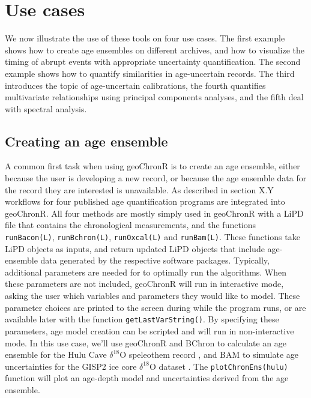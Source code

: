 \documentclass[gc, manuscript]{copernicus}
\begin{document}
\hypertarget{sec:use-cases}{%
\section{Use cases}\label{sec:use-cases}}

We now illustrate the use of these tools on four use cases. The first example shows how to create age ensembles on different archives, and how to visualize the timing of abrupt events with appropriate uncertainty quantification. The second example shows how to quantify similarities in age-uncertain records. The third introduces the topic of age-uncertain calibrations, the fourth quantifies multivariate relationships using principal components analyses, and the fifth deal with spectral analysis.

\subsection{Creating an age ensemble}

A common first task when using geoChronR is to create an age ensemble, either because the user is developing a new record, or because the age ensemble data for the record they are interested is unavailable.
As described in section X.Y workflows for four published age quantification programs are integrated into geoChronR.
All four methods are mostly simply used in geoChronR with a LiPD file that contains the chronological measurements, and the functions \texttt{runBacon(L)}, \texttt{runBchron(L)}, \texttt{runOxcal(L)} and \texttt{runBam(L)}.
These functions take LiPD objects as inputs, and return updated LiPD objects that include age-ensemble data generated by the respective software packages.
Typically, additional parameters are needed for to optimally run the algorithms.
When these parameters are not included, geoChronR will run in interactive mode, asking the user which variables and parameters they would like to model.
These parameter choices are printed to the screen during while the program runs, or are available later with the function \texttt{getLastVarString()}.
By specifying these parameters, age model creation can be scripted and will run in non-interactive mode.
In this use case, we'll use geoChronR and BChron \citep{parnell2008flexible} to calculate an age ensemble for the Hulu Cave \(\delta^{18}\)O speleothem record \citep{hulu2001}, and BAM \citep{BAM} to simulate age uncertainties for the GISP2 ice core \(\delta^{18}\)O dataset \citep{alley}.
The \texttt{plotChronEns(hulu)} function will plot an age-depth model and uncertainties derived from the age ensemble.
\end{document}
